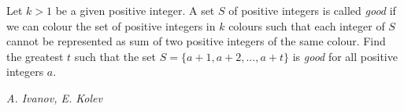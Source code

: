 Let $k>1$ be a given positive integer. A set $S$ of positive integers is called \textit{good} if we can colour the set of positive integers in $k$ colours such that each integer of $S$ cannot be represented as sum of two positive integers of the same colour. Find the greatest $t$ such that the set $S=\{a+1,a+2,\ldots ,a+t\}$ is \textit{good} for all positive integers $a$.

\textit{A. Ivanov, E. Kolev}